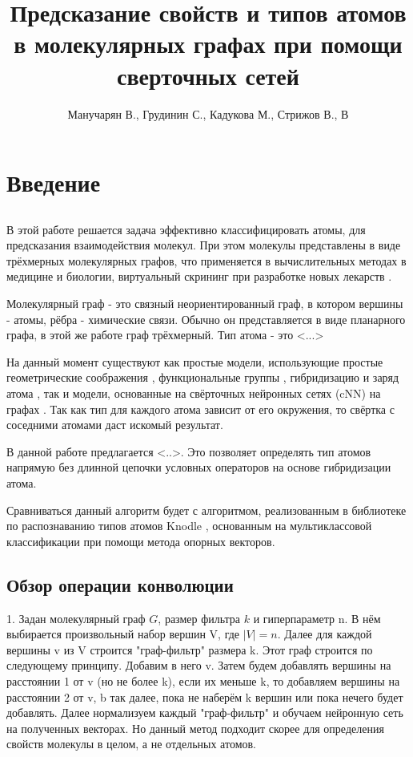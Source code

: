 \documentclass[12pt,twoside]{article}
\title
    [] %
    {Предсказание свойств и типов атомов в молекулярных графах при помощи сверточных сетей}
\author
    [] %
    {Манучарян В., Грудинин С., Кадукова М., Стрижов В., В} %
    [Манучарян В., Грудинин С., Кадукова М., Стрижов В., В] %
\begin{document}
\maketitle
\section{Введение}
\subsection{}
	В этой работе решается задача эффективно классифицировать атомы, для предсказания взаимодействия молекул. При этом молекулы представлены \cite{} в виде трёхмерных молекулярных графов, что применяется в вычислительных методах в медицине и биологии, виртуальный скрининг при разработке новых лекарств \cite{article2}.
	
	Молекулярный граф - это связный неориентированный граф, в котором вершины - атомы, рёбра - химические связи. Обычно он представляется в виде планарного графа, в этой же работе граф трёхмерный. Тип атома - это <...>
	
	На данный момент существуют как простые модели, использующие простые геометрические соображения \cite{article3}, функциональные группы \cite{article4}, гибридизацию и заряд атома \cite{article5,article6,article7,article8}, так и модели, основанные на свёрточных нейронных сетях (cNN) на графах \cite{article15,article16,article20}. Так как тип для каждого атома зависит от его окружения, то свёртка с соседними атомами даст искомый результат.
	
	В данной работе предлагается <..>. Это позволяет определять тип атомов напрямую без длинной цепочки условных операторов на основе гибридизации атома.
	
	Сравниваться данный алгоритм будет с алгоритмом, реализованным в библиотеке по распознаванию типов атомов Knodle \cite{article1}, основанным на мультиклассовой классификации при помощи метода опорных векторов.
	
\subsection{Обзор операции конволюции}
1. Задан молекулярный граф $G$, размер фильтра $k$ и гиперпараметр n. В нём выбирается произвольный набор вершин V, где $|V|=n$. Далее для каждой вершины v из V строится "граф-фильтр" размера k. Этот граф строится по следующему принципу. Добавим в него v. Затем будем добавлять вершины на расстоянии 1 от v (но не более k), если их меньше k, то добавляем вершины на расстоянии 2 от v, b так далее, пока не наберём k вершин или пока нечего будет добавлять. Далее нормализуем каждый "граф-фильтр" и обучаем нейронную сеть на полученных векторах.\cite{article15} Но данный метод подходит скорее для определения свойств молекулы в целом, а не отдельных атомов.
\end{document}
